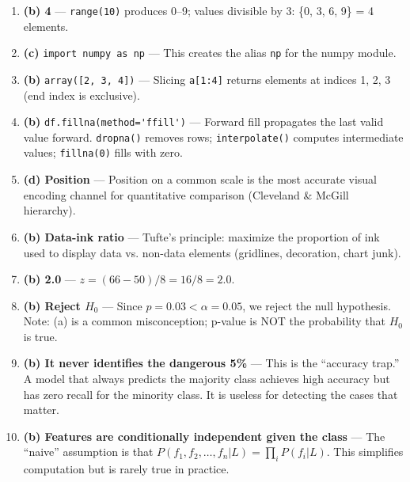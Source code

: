 \documentclass[11pt,a4paper]{article}
\begin{document}
\begin{enumerate}
\item \textbf{(b) 4} --- \lstinline{range(10)} produces 0--9; values divisible by 3: \{0, 3, 6, 9\} = 4 elements.

\item \textbf{(c)} \lstinline{import numpy as np} --- This creates the alias \lstinline{np} for the numpy module.

\item \textbf{(b)} \lstinline{array([2, 3, 4])} --- Slicing \lstinline{a[1:4]} returns elements at indices 1, 2, 3 (end index is exclusive).

\item \textbf{(b)} \lstinline{df.fillna(method='ffill')} --- Forward fill propagates the last valid value forward. \lstinline{dropna()} removes rows; \lstinline{interpolate()} computes intermediate values; \lstinline{fillna(0)} fills with zero.

\item \textbf{(d) Position} --- Position on a common scale is the most accurate visual encoding channel for quantitative comparison (Cleveland \& McGill hierarchy).

\item \textbf{(b) Data-ink ratio} --- Tufte's principle: maximize the proportion of ink used to display data vs. non-data elements (gridlines, decoration, chart junk).

\item \textbf{(b) 2.0} --- $z = (66 - 50) / 8 = 16 / 8 = 2.0$.

\item \textbf{(b) Reject $H_0$} --- Since $p = 0.03 < \alpha = 0.05$, we reject the null hypothesis. Note: (a) is a common misconception; p-value is NOT the probability that $H_0$ is true.

\item \textbf{(b) It never identifies the dangerous 5\%} --- This is the ``accuracy trap.'' A model that always predicts the majority class achieves high accuracy but has zero recall for the minority class. It is useless for detecting the cases that matter.

\item \textbf{(b) Features are conditionally independent given the class} --- The ``naive'' assumption is that $P(f_1, f_2, \ldots, f_n | L) = \prod_i P(f_i | L)$. This simplifies computation but is rarely true in practice.
\end{enumerate}
\end{document}
